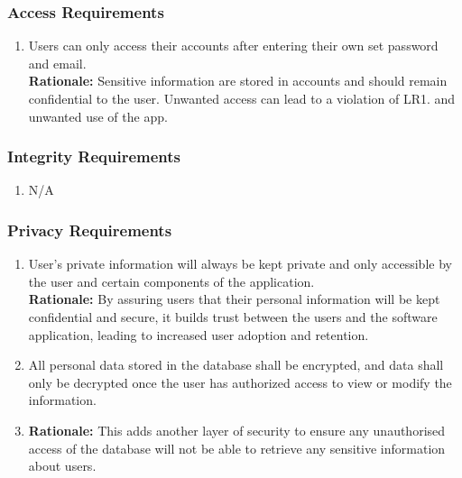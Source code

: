 \documentclass[]{article}
\begin{document}
\subsubsection{Access Requirements}
\label{ssub:access_requirements}
\begin{enumerate}[{SR-AC}1. ]
	\item Users can only access their accounts after entering their own set password and email.\\
	{\bf Rationale:} Sensitive information are stored in accounts and should remain confidential to the user. Unwanted access can lead to a violation of LR1. and unwanted use of the app. 
\end{enumerate}

\subsubsection{Integrity Requirements}
\label{ssub:integrity_requirements}
\begin{enumerate}[{SR-INT}1. ]
	\item N/A
\end{enumerate}

\subsubsection{Privacy Requirements}
\label{ssub:privacy_requirements}
\begin{enumerate}[{SR-P}1. ]
	\item User's private information will always be kept private and only accessible by the user and certain components of the application.\\
	{\bf Rationale:} By assuring users that their personal information will be kept confidential and secure, it builds trust between the users and the software application, leading to increased user adoption and retention. 
	\item All personal data stored in the database shall be encrypted, and data shall only be decrypted once the user has authorized access to view or modify the information.\\
	\item {\bf Rationale:} This adds another layer of security to ensure any unauthorised access of the database will not be able to retrieve any sensitive information about users. 
\end{enumerate}
\end{document}
